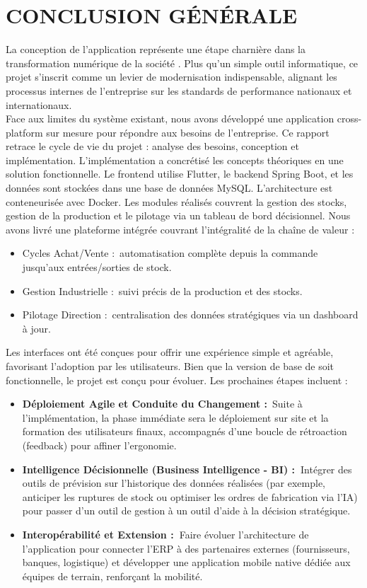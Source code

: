 \chapter*{CONCLUSION GÉNÉRALE}
\adjustmtc
\thispagestyle{MyStyle}

La conception de l’application \reportAppName{} représente une étape charnière dans la
transformation numérique de la société \reportEntreprise{}.
 Plus qu’un simple outil
informatique, ce projet s’inscrit comme un levier de modernisation indispensable, alignant les
processus internes de l’entreprise sur les standards de performance nationaux et internationaux.\\
Face aux limites du système existant, nous avons développé une application cross-platform sur mesure pour répondre aux besoins de l’entreprise.
Ce rapport retrace le cycle de vie du projet : analyse des besoins, conception et implémentation.
L'implémentation a concrétisé les concepts théoriques en une solution fonctionnelle. Le frontend utilise Flutter, le backend Spring Boot, et les données sont stockées dans une base de données MySQL. L'architecture est conteneurisée avec Docker. Les modules réalisés couvrent la gestion des stocks, gestion de la production et le pilotage via un tableau de bord décisionnel.
Nous avons livré une plateforme intégrée couvrant l'intégralité de la chaîne de valeur :
\begin{itemize}
\item Cycles Achat/Vente : automatisation complète depuis la commande jusqu'aux entrées/sorties de stock.
\item Gestion Industrielle : suivi précis de la production et des stocks.
\item Pilotage Direction : centralisation des données stratégiques via un dashboard à jour.
\end{itemize}
Les interfaces ont été conçues pour offrir une expérience simple et agréable, favorisant l'adoption par les utilisateurs.
Bien que la version de base de \reportAppName{} soit fonctionnelle, le projet est conçu pour évoluer. Les prochaines étapes incluent :
\begin{itemize}
\item \textbf{Déploiement Agile et Conduite du Changement :} Suite à l'implémentation, la phase immédiate sera le déploiement sur site et la formation des utilisateurs finaux, accompagnés d'une boucle de rétroaction (feedback) pour affiner l'ergonomie.
\item \textbf{Intelligence Décisionnelle (Business Intelligence - BI) : }Intégrer des outils de prévision sur l'historique des données réalisées (par exemple, anticiper les ruptures de stock ou optimiser les ordres de fabrication via l'IA) pour passer d'un outil de gestion à un outil d'aide à la décision stratégique.
\item \textbf{Interopérabilité et Extension : }Faire évoluer l'architecture de l'application pour connecter l'ERP à des partenaires externes (fournisseurs, banques, logistique) et développer une application mobile native dédiée aux équipes de terrain, renforçant la mobilité.
\end{itemize}
